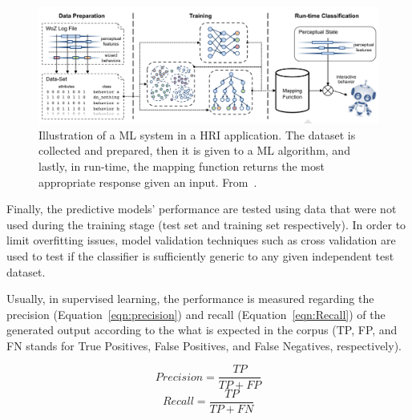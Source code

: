 \begin{figure}[hbt]
  \centering
	\includegraphics[width=\textwidth]{images/RestrictedPerception_ML_Diagram.png}
  	\caption{Illustration of a \ac{ML} system in a \ac{HRI} application. The dataset is collected and prepared, then it is given to a \ac{ML} algorithm, and lastly, in run-time, the mapping function returns the most appropriate response given an input. From~\cite{Sequeira2016}.}
  	\label{fig:MLDiagram}
\end{figure}
\vspace{-3mm}

Finally, the predictive models' performance are tested using data that were not used during the training stage (test set and training set respectively). In order to limit overfitting issues, model validation techniques such as cross validation are used to test if the classifier is sufficiently generic to any given independent test dataset.

Usually, in supervised learning, the performance is measured regarding the precision (Equation~\ref{eqn:precision}) and recall (Equation~\ref{eqn:Recall}) of the generated output according to the what is expected in the corpus (TP, FP, and FN stands for True Positives, False Positives, and False Negatives, respectively).

\vspace{-9mm}
\begin{multicols}{2}
	\begin{equation}
		Precision = \frac{TP}{TP + FP}
		\label{eqn:precision}
	\end{equation}\break
	\begin{equation}
		Recall = \frac{TP}{TP + FN}
		\label{eqn:Recall}
	\end{equation}
\end{multicols}